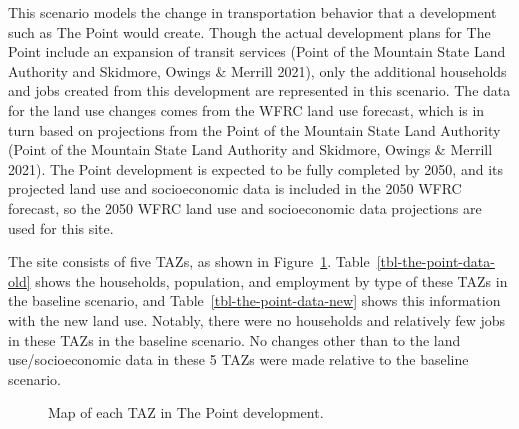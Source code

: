 \documentclass[fancy, oneside, mastersfancy, ms]{byuthesis}
\begin{document}
This scenario models the change in transportation behavior that a
development such as The Point would create. Though the actual
development plans for The Point include an expansion of transit services
(Point of the Mountain State Land Authority and Skidmore, Owings \&
Merrill 2021), only the additional households and jobs created from this
development are represented in this scenario. The data for the land use
changes comes from the WFRC land use forecast, which is in turn based on
projections from the Point of the Mountain State Land Authority (Point
of the Mountain State Land Authority and Skidmore, Owings \& Merrill
2021). The Point development is expected to be fully completed by 2050,
and its projected land use and socioeconomic data is included in the
2050 WFRC forecast, so the 2050 WFRC land use and socioeconomic data
projections are used for this site.

The site consists of five TAZs, as shown in
Figure~\ref{fig-the-point-zones}. Table~\ref{tbl-the-point-data-old}
shows the households, population, and employment by type of these TAZs
in the baseline scenario, and Table~\ref{tbl-the-point-data-new} shows
this information with the new land use. Notably, there were no
households and relatively few jobs in these TAZs in the baseline
scenario. No changes other than to the land use/socioeconomic data in
these 5 TAZs were made relative to the baseline scenario.

\begin{figure}


\caption{\label{fig-the-point-zones}Map of each TAZ in The Point
development.}

\end{figure}%

\begin{table}

\caption{\label{tbl-the-point-data-old}TAZ-level Socioeconomic Data for
The Point (Baseline Scenario)}


\end{table}%
\end{document}
